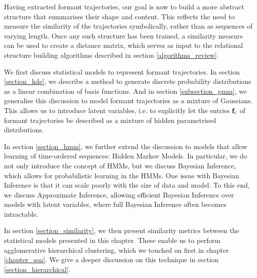 \documentclass[../main.tex]{subfiles}
\begin{document}
 \label{chapter_hmms}

Having extracted formant trajectories, our goal is now to build a more abstract structure that summarises their shape and content. This reflects the need to measure the similarity of the trajectories symbolically, rather than as sequences of varying length. Once any such structure has been trained, a similarity measure can be used to create a distance matrix, which serves as input to the relational structure building algorithms described in section \ref{algorithms_review}.
\par We first discuss statistical models to represent formant trajectories. In section \ref{section_kde}, we describe a method to generate discrete probability distributions as a linear combination of basis functions. And in section \ref{subsection_gmm}, we generalise this discussion to model formant trajectories as a mixture of Gaussians. This allows us to introduce latent variables, i.e. to explicitly let the entries $\mathbf{f}_i$ of formant trajectories be described as a mixture of hidden parametrised distributions.
\par In section \ref{section_hmm}, we further extend the discussion to models that allow learning of time-ordered sequences: Hidden Markov Models. In particular, we do not only introduce the concept of HMMs, but we discuss Bayesian Inference, which allows for probabilistic learning in the HMMs. One issue with Bayesian Inference is that it can scale poorly with the size of data and model. To this end, we discuss Approximate Inference, allowing efficient Bayesian Inference over models with latent variables, where full Bayesian Inference often becomes intractable.
\par In section \ref{section_similarity}, we then present similarity metrics between the statistical models presented in this chapter. These enable us to perform agglomerative hierarchical clustering, which we touched on first in chapter \ref{chapter_soa}. We give a deeper discussion on this technique in section \ref{section_hierarchical}.
\end{document}
